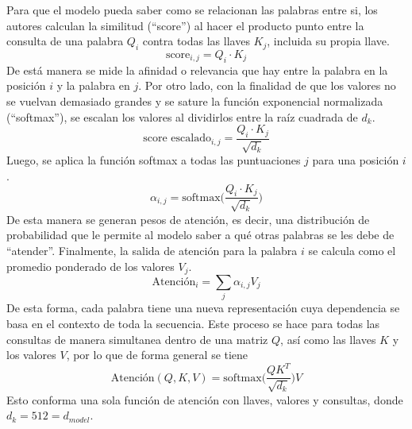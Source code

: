 \documentclass[12pt,letterpaper]{article}
\begin{document}
Para que el modelo pueda saber como se relacionan las palabras entre si, los autores \cite{vaswani2017attention} calculan la similitud (``score'') al hacer el producto punto entre la consulta de una palabra $Q_i$ contra todas las llaves $K_j$, incluida su propia llave. 
\begin{equation}
    \text{score}_{i,j}=Q_i\cdot K_j
\end{equation}
De está manera se mide la afinidad o relevancia que hay entre la palabra en la posición $i$ y la palabra en $j$. Por otro lado, con la finalidad de que los valores no se vuelvan demasiado grandes y se sature la función exponencial normalizada (``softmax''), se escalan los valores al dividirlos entre la raíz cuadrada de $d_k$. 
\begin{equation}
    \text{score escalado}_{i,j} = \frac{Q_i \cdot K_j}{\sqrt{d_k}}
\end{equation}
Luego, se aplica la función softmax a todas las puntuaciones $j$ para una posición $i$.
\begin{equation}
     \alpha_{i,j} = \text{softmax}\bigg( \frac{Q_i \cdot K_j}{\sqrt{d_k}} \bigg)
\end{equation}
De esta manera se generan pesos de atención, es decir, una distribución de probabilidad que le permite al modelo saber a qué otras palabras se les debe de ``atender''. 
Finalmente, la salida de atención para la palabra $i$ se calcula como el promedio ponderado de los valores $V_j$.
\begin{equation}
    \text{Atención}_i = \sum_j \alpha_{i,j} V_j
\end{equation}
De esta forma, cada palabra tiene una nueva representación cuya dependencia se basa en el contexto de toda la secuencia. Este proceso se hace para todas las consultas de manera simultanea dentro de una matriz $Q$, así como las llaves $K$ y los valores $V$, por lo que de forma general se tiene
\begin{equation}
    \text{Atención}(Q, K, V) = \text{softmax}\big( \frac{QK^T}{\sqrt{d_k}} \big)V 
\end{equation}
Esto conforma una sola función de atención con llaves, valores y consultas, donde $d_k=512=d_{model}$.
\end{document}
